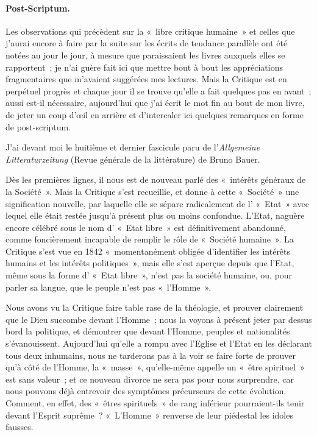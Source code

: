 \documentclass[french,twoside]{book} %
\begin{document}
\paragraph[{Post-Scriptum.}]{Post-Scriptum.}
\noindent Les observations qui précèdent sur la « libre critique humaine » et celles que j’aurai encore à faire  par la suite sur les écrits de tendance parallèle ont été notées au jour le jour, à mesure que paraissaient les livres auxquels elles se rapportent ; je n’ai guère fait ici que mettre bout à bout les appréciations fragmentaires que m’avaient suggérées mes lectures. Mais la Critique est en perpétuel progrès et chaque jour il se trouve qu’elle a fait quelques pas en avant ; aussi est-il nécessaire, aujourd’hui que j’ai écrit le mot fin au bout de mon livre, de jeter un coup d’œil en arrière et d’intercaler ici quelques remarques en forme de post-scriptum.\par
J’ai devant moi le huitième et dernier fascicule paru de l’\emph{Allgemeine Litteraturzeitung} (Revue générale de la littérature) de Bruno Bauer.\par
Dès les premières lignes, il nous est de nouveau parlé des « intérêts généraux de la Société ». Mais la Critique s’est recueillie, et donne à cette « Société » une signification nouvelle, par laquelle elle se sépare radicalement de l’ « Etat » avec lequel elle était restée jusqu’à présent plus ou moins confondue. L’Etat, naguère encore célébré sous le nom d’ « Etat libre » est définitivement abandonné, comme foncièrement incapable de remplir le rôle de « Société humaine ». La Critique s’est vue en 1842 « momentanément obligée d’identifier les intérêts humains et les intérêts politiques », mais elle s’est aperçue depuis que l’Etat, même sous la forme d’ « Etat libre », n’est pas la société humaine, ou, pour parler sa langue, que le peuple n’est pas « l’Homme ».\par
Nous avons vu la Critique faire table rase de la théologie, et prouver clairement que le Dieu succombe devant l’Homme ; nous la voyons à présent jeter par dessus bord la politique, et démontrer que devant l’Homme, peuples et nationalités s’évanouissent. Aujourd’hui qu’elle a rompu avec l’Eglise et l’Etat en les déclarant tous deux inhumains, nous ne tarderons pas à la voir se faire forte de prouver qu’à côté de l’Homme, la « masse », qu’elle-même appelle  un « être spirituel » est sans valeur ; et ce nouveau divorce ne sera pas pour nous surprendre, car nous pouvons déjà entrevoir des symptômes précurseurs de cette évolution. Comment, en effet, des « êtres spirituels » de rang inférieur pourraient-ils tenir devant l’Esprit suprême ? « L’Homme » renverse de leur piédestal les idoles fausses.\par
\end{document}
